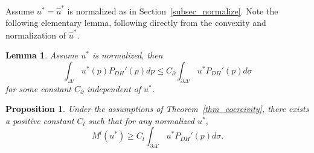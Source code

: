 \documentclass{amsart}
\newtheorem{lem}[thm]{Lemma}
\newtheorem{prop}[thm]{Proposition}
\theoremstyle{definition}
\begin{document}
Assume $u^*=\hat{u}^*$ is normalized as in Section~\ref{subsec_normalize}. 
Note the following elementary lemma, following directly from the convexity and 
normalization of $\hat{u}^*$. 

\begin{lem}
\label{lem_poltoboundary}
Assume $u^*$ is normalized, then 
\[
\int_{\Delta'} u^*(p)P_{DH}'(p)dp \leq 
C_{\partial} \int_{\partial \Delta'} u^*P_{DH}'(p)d\sigma
\]
for some constant $C_{\partial}$ independent of $u^*$.
\end{lem}

\begin{prop}
\label{prop_coercivity_linear}
Under the assumptions of Theorem~\ref{thm_coercivity}, 
there exists a positive 
constant $C_l$ such that for any normalized $u^*$, 
\[
M^l(u^*)\geq 
C_l \int_{\partial \Delta'} u^*P_{DH}'(p)d\sigma. 
\]
\end{prop}
\end{document}

